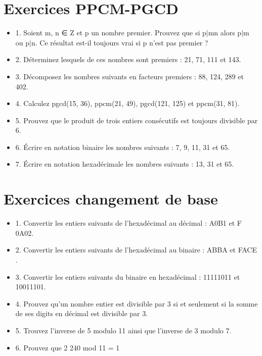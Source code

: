\vspace{3mm} %
\section{Exercices PPCM-PGCD}
\vspace{3mm} %

\begin{itemize}

\item {1. Soient m, n ∈ Z et p un nombre premier. Prouvez que si p$|$mn alors p$|$m ou p$|$n. Ce résultat est-il toujours vrai si p n’est pas premier ? }

\item {2. Déterminez lesquels de ces nombres sont premiers : 21, 71, 111 et 143.}

\item {3. Décomposez les nombres suivants en facteurs premiers : 88, 124, 289 et 402.}

\item {4. Calculez pgcd(15, 36), ppcm(21, 49), pgcd(121, 125) et ppcm(31, 81).}

\item{5. Prouvez que le produit de trois entiers consécutifs est toujours divisible par 6.}

\item {6. Écrire en notation binaire les nombres suivants : 7, 9, 11, 31 et 65.}

\item {7. Écrire en notation hexadécimale les nombres suivants : 13, 31 et 65.}

\end{itemize}


\vspace{3mm} %
\section{Exercices changement de base}
\vspace{3mm} %

\begin{itemize}

\item {1. Convertir les entiers suivants de l’hexadécimal au décimal : A0B1 et F 0A02. }

\item {2. Convertir les entiers suivants de l’hexadécimal au binaire : ABBA et FACE .}

\item {3. Convertir les entiers suivants du binaire en hexadécimal : 11111011 et 10011101.}

\item {4. Prouvez qu’un nombre entier est divisible par 3 si et seulement si la somme de ses digits en décimal est divisible par 3.}

\item {5. Trouvez l’inverse de 5 modulo 11 ainsi que l’inverse de 3 modulo 7.}

\item {6. Prouvez que 2 240 mod 11 = 1}

\end{itemize}
